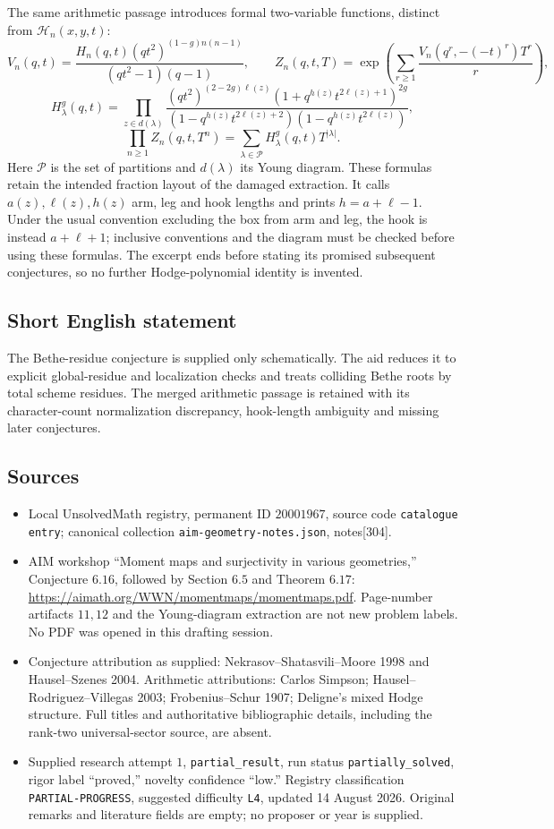 \documentclass[11pt]{article}
\begin{document}
The same arithmetic passage introduces formal two-variable functions, distinct from \(\mathcal H_n(x,y,t)\):
\[
 V_n(q,t)=\frac{H_n(q,t)(qt^2)^{(1-g)n(n-1)}}{(qt^2-1)(q-1)},\qquad
 Z_n(q,t,T)=\exp\!\left(\sum_{r\geq1}
          \frac{V_n(q^r,-(-t)^r)T^r}{r}\right),
\]
\[
 H_\lambda^g(q,t)=\prod_{z\in d(\lambda)}
 \frac{(qt^2)^{(2-2g)\ell(z)}
       (1+q^{h(z)}t^{2\ell(z)+1})^{2g}}
      {(1-q^{h(z)}t^{2\ell(z)+2})(1-q^{h(z)}t^{2\ell(z)})},
\]
\[
 \prod_{n\geq1}Z_n(q,t,T^n)
       =\sum_{\lambda\in\mathcal P}H_\lambda^g(q,t)T^{|\lambda|}.
\]
Here \(\mathcal P\) is the set of partitions and \(d(\lambda)\) its Young diagram. These formulas retain the intended fraction layout of the damaged extraction. It calls \(a(z),\ell(z),h(z)\) arm, leg and hook lengths and prints \(h=a+\ell-1\). Under the usual convention excluding the box from arm and leg, the hook is instead \(a+\ell+1\); inclusive conventions and the diagram must be checked before using these formulas. The excerpt ends before stating its promised subsequent conjectures, so no further Hodge-polynomial identity is invented.
\subsection{Short English statement}
The Bethe-residue conjecture is supplied only schematically. The aid reduces it to explicit global-residue and localization checks and treats colliding Bethe roots by total scheme residues. The merged arithmetic passage is retained with its character-count normalization discrepancy, hook-length ambiguity and missing later conjectures.
\subsection{Sources}
\begin{itemize}
\item Local UnsolvedMath registry, permanent ID \(20001967\), source code \texttt{catalogue entry}; canonical collection \texttt{aim-geometry-notes.json}, notes[304].
\item AIM workshop ``Moment maps and surjectivity in various geometries,'' Conjecture \(6.16\), followed by Section \(6.5\) and Theorem \(6.17\): \url{https://aimath.org/WWN/momentmaps/momentmaps.pdf}. Page-number artifacts \(11,12\) and the Young-diagram extraction are not new problem labels. No PDF was opened in this drafting session.
\item Conjecture attribution as supplied: Nekrasov--Shatasvili--Moore 1998 and Hausel--Szenes 2004. Arithmetic attributions: Carlos Simpson; Hausel--Rodriguez--Villegas 2003; Frobenius--Schur 1907; Deligne's mixed Hodge structure. Full titles and authoritative bibliographic details, including the rank-two universal-sector source, are absent.
\item Supplied research attempt \(1\), \texttt{partial\_result}, run status \texttt{partially\_solved}, rigor label ``proved,'' novelty confidence ``low.'' Registry classification \texttt{PARTIAL-PROGRESS}, suggested difficulty \texttt{L4}, updated 14 August 2026. Original remarks and literature fields are empty; no proposer or year is supplied.
\end{itemize}
\end{document}

